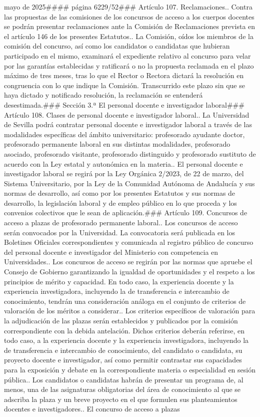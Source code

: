 \documentclass{article}
\begin{document}
\begin{itemize}
{{mayo de 2025\n#### página 6229/52\n\n### Artículo 107. Reclamaciones.. Contra las propuestas de las comisiones de los concursos de acceso a los cuerpos docentes se podrán presentar reclamaciones ante la Comisión de Reclamaciones prevista en el artículo 146 de los presentes Estatutos.. La Comisión, oídos los miembros de la comisión del concurso, así como los candidatos o candidatas que hubieran participado en el mismo, examinará el expediente relativo al concurso para velar por las garantías establecidas y ratificará o no la propuesta reclamada en el plazo máximo de tres meses, tras lo que el Rector o Rectora dictará la resolución en congruencia con lo que indique la Comisión. Transcurrido este plazo sin que se haya dictado y notificado resolución, la reclamación se entenderá desestimada.\n\n### Sección 3.ª El personal docente e investigador laboral\n\n### Artículo 108. Clases de personal docente e investigador laboral.. La Universidad de Sevilla podrá contratar personal docente e investigador laboral a través de las modalidades específicas del ámbito universitario: profesorado ayudante doctor, profesorado permanente laboral en sus distintas modalidades, profesorado asociado, profesorado visitante, profesorado distinguido y profesorado sustituto de acuerdo con la Ley estatal y autonómica en la materia.. El personal docente e investigador laboral se regirá por la Ley Orgánica 2/2023, de 22 de marzo, del Sistema Universitario, por la Ley de la Comunidad Autónoma de Andalucía y sus normas de desarrollo, así como por los presentes Estatutos y sus normas de desarrollo, la legislación laboral y de empleo público en lo que proceda y los convenios colectivos que le sean de aplicación.\n\n### Artículo 109. Concursos de acceso a plazas de profesorado permanente laboral.. Los concursos de acceso serán convocados por la Universidad. La convocatoria será publicada en los Boletines Oficiales correspondientes y comunicada al registro público de concurso del personal docente e investigador del Ministerio con competencia en Universidades.. Los concursos de acceso se regirán por las normas que apruebe el Consejo de Gobierno garantizando la igualdad de oportunidades y el respeto a los principios de mérito y capacidad. En todo caso, la experiencia docente y la experiencia investigadora, incluyendo la de transferencia e intercambio de conocimiento, tendrán una consideración análoga en el conjunto de criterios de valoración de los méritos a considerar.. Los criterios específicos de valoración para la adjudicación de las plazas serán establecidos y publicados por la comisión correspondiente con la debida antelación. Dichos criterios deberán referirse, en todo caso, a la experiencia docente y la experiencia investigadora, incluyendo la de transferencia e intercambio de conocimiento, del candidato o candidata, su proyecto docente e investigador, así como permitir contrastar sus capacidades para la exposición y debate en la correspondiente materia o especialidad en sesión pública.. Los candidatos o candidatas habrán de presentar un programa de, al menos, una de las asignaturas obligatorias del área de conocimiento al que se adscriba la plaza y un breve proyecto en el que formulen sus planteamientos docentes e investigadores.. El concurso de acceso a plazas }}
\end{itemize}
\end{document}
